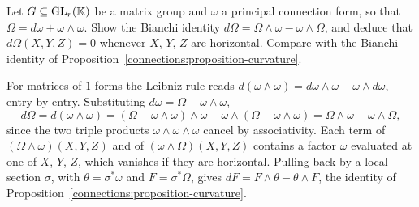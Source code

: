 \begin{exercise}\label{connections:exercise-principal-bianchi}
Let $G \subseteq \mathrm{GL}_r(\mathbb{K})$ be a matrix group and $\omega$ a principal connection form, so that $\Omega = d\omega + \omega \wedge \omega$. Show the Bianchi identity $d\Omega = \Omega \wedge \omega - \omega \wedge \Omega$,
and deduce that $d\Omega(X, Y, Z) = 0$ whenever $X$, $Y$, $Z$ are horizontal. Compare with the Bianchi identity of Proposition~\ref{connections:proposition-curvature}.
\end{exercise}

\begin{solution}
For matrices of $1$-forms the Leibniz rule reads $d(\omega \wedge \omega) = d\omega \wedge \omega - \omega \wedge d\omega$, entry by entry. Substituting $d\omega = \Omega - \omega \wedge \omega$,
\[
d\Omega = d(\omega \wedge \omega) = (\Omega - \omega \wedge \omega) \wedge \omega - \omega \wedge (\Omega - \omega \wedge \omega) = \Omega \wedge \omega - \omega \wedge \Omega,
\]
since the two triple products $\omega \wedge \omega \wedge \omega$ cancel by associativity. Each term of $(\Omega \wedge \omega)(X, Y, Z)$ and of $(\omega \wedge \Omega)(X, Y, Z)$ contains a factor $\omega$
evaluated at one of $X$, $Y$, $Z$, which vanishes if they are horizontal. Pulling back by a local section $\sigma$, with $\theta = \sigma^*\omega$ and $F = \sigma^*\Omega$, gives
$dF = F \wedge \theta - \theta \wedge F$, the identity of Proposition~\ref{connections:proposition-curvature}.
\end{solution}
